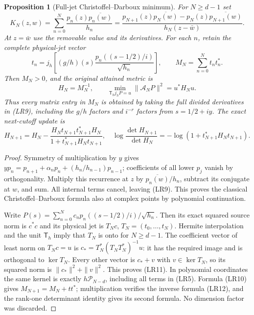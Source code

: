 \documentclass[11pt]{article}
\newtheorem{proposition}[theorem]{Proposition}
\theoremstyle{remark}\newtheorem{remark}[theorem]{Remark}
\begin{document}
\begin{proposition}[Full-jet Christoffel--Darboux minimum]
For $N\ge d-1$ set
\[
 K_N(z,w)=\sum_{n=0}^N\frac{p_n(z)\overline{p_n(w)}}{h_n}
 =\frac{p_{N+1}(z)\overline{p_N(w)}-
 p_N(z)\overline{p_{N+1}(w)}}{h_N(z-\bar w)}.\tag{LR9}
\]
At $z=\bar w$ use the removable value and its derivatives.
For each $n$, retain the complete physical-jet vector
\[
 t_n=j_h\left[(g/h)(s)\frac{p_n((s-1/2)/i)}{\sqrt{h_n}}\right],
 \qquad M_N=\sum_{n=0}^N t_nt_n^*.\tag{LR10}
\]
Then $M_N>0$, and the original attained metric is
\[
 H_N=M_N^{-1},\qquad
 \min_{\mathsf T_hj_hP=u}\|\mathcal A_NP\|^2=u^*H_Nu.
 \tag{LR11}
\]
Thus every matrix entry in $M_N$ is obtained by taking the full divided
derivatives in (LR9), including the $g/h$ factors and $i^{-r}$ factors
from $s=1/2+iy$. The exact next-cutoff update is
\[
 H_{N+1}=H_N-\frac{H_Nt_{N+1}t_{N+1}^*H_N}
 {1+t_{N+1}^*H_Nt_{N+1}},\quad
 \log\frac{\det H_{N+1}}{\det H_N}
 =-\log(1+t_{N+1}^*H_Nt_{N+1}).\tag{LR12}
\]
\end{proposition}
\begin{proof}
Symmetry of multiplication by $y$ gives
$yp_n=p_{n+1}+\alpha_np_n+(h_n/h_{n-1})p_{n-1}$; coefficients
of all lower $p_j$ vanish by orthogonality. Multiply this recurrence
at $z$ by $\overline{p_n(w)}/h_n$, subtract its conjugate at $w$,
and sum. All internal terms cancel, leaving (LR9). This proves the
classical Christoffel--Darboux formula \cite[18.2.12]{DLMF18}
also at complex points by polynomial continuation.

Write $P(s)=\sum_{n=0}^N c_np_n((s-1/2)/i)/\sqrt{h_n}$.
Then its exact squared source norm is $c^*c$ and its physical jet is
$T_Nc$, $T_N=(t_0,\ldots,t_N)$. Hermite interpolation and the unit
$\mathsf T_h$ imply that $T_N$ is onto for $N\ge d-1$.
The coefficient vector of least norm on $T_Nc=u$ is
$c_*=T_N^*(T_NT_N^*)^{-1}u$: it has the required image and is
orthogonal to $\ker T_N$. Every other vector is $c_*+v$ with
$v\in\ker T_N$, so its squared norm is $\|c_*\|^2+\|v\|^2$.
This proves (LR11). In polynomial coordinates the same kernel is
exactly $h\mathcal P_{N-d}$, including all terms in (LR5).
Formula (LR10) gives $M_{N+1}=M_N+tt^*$; multiplication verifies
the inverse formula (LR12), and the rank-one determinant identity
gives its second formula. No dimension factor was discarded.
\end{proof}
\end{document}
